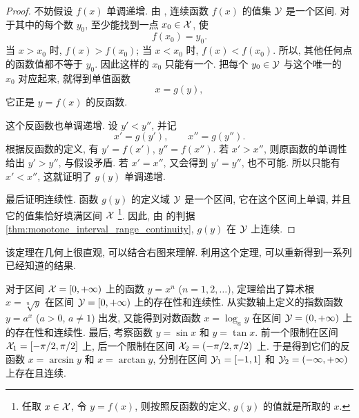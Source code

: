 \begin{proof}
不妨假设 $f(x)$ 单调递增.
由 , 连续函数 $f(x)$ 的值集 $\mathcal{Y}$ 是一个区间.
对于其中的每个数 $y_0$, 至少能找到一点 $x_0\in\mathcal{X}$, 使
$$ 
f(x_0)=y_0.
$$
当 $x>x_0$ 时, $f(x)>f(x_0)$; 当 $x<x_0$ 时, $f(x)<f(x_0)$.
所以, 其他任何点的函数值都不等于 $y_0$.
因此这样的 $x_0$ 只能有一个.
把每个 $y_0\in\mathcal{Y}$ 与这个唯一的 $x_0$ 对应起来, 就得到单值函数
$$
x=g(y),
$$
它正是 $y=f(x)$ 的反函数.

这个反函数也单调递增.
设 $y'<y''$, 并记
$$
x'=g(y'),\qquad x''=g(y'').
$$
根据反函数的定义, 有 $y'=f(x')$, $y''=f(x'')$.
若 $x'>x''$, 则原函数的单调性给出 $y'>y''$, 与假设矛盾.
若 $x'=x''$, 又会得到 $y'=y''$, 也不可能.
所以只能有 $x'<x''$, 这就证明了 $g(y)$ 单调递增.

最后证明连续性.
函数 $g(y)$ 的定义域 $\mathcal{Y}$ 是一个区间, 它在这个区间上单调,
并且它的值集恰好填满区间 $\mathcal{X}$
\footnote{任取 $x\in\mathcal{X}$, 令 $y=f(x)$, 则按照反函数的定义, $g(y)$ 的值就是所取的 $x$.}.
因此, 由  的判据 \ref{thm:monotone_interval_range_continuity},
$g(y)$ 在 $\mathcal{Y}$ 上连续.
\end{proof}

该定理在几何上很直观, 可以结合右图来理解.
利用这个定理, 可以重新得到一系列已经知道的结果.

\begin{figure}
    \centering
\end{figure}
对于区间 $\mathcal{X}=[0,+\infty)$ 上的函数 $y=x^n$ ($n=1,2,\ldots$),
定理给出了算术根 $x=\sqrt[n]y$ 在区间 $\mathcal{Y}=[0,+\infty)$ 上的存在性和连续性.
从实数轴上定义的指数函数 $y=a^x$ ($a>0$, $a\neq1$) 出发,
又能得到对数函数 $x=\log_a y$ 在区间 $\mathcal{Y}=(0,+\infty)$ 上的存在性和连续性.
最后, 考察函数 $y=\sin x$ 和 $y=\tan x$.
前一个限制在区间 $\mathcal{X}_1=[-\pi/2,\pi/2]$ 上,
后一个限制在区间 $\mathcal{X}_2=(-\pi/2,\pi/2)$ 上.
于是得到它们的反函数 $x=\arcsin y$ 和 $x=\arctan y$,
分别在区间 $\mathcal{Y}_1=[-1,1]$ 和 $\mathcal{Y}_2=(-\infty,+\infty)$ 上存在且连续.

